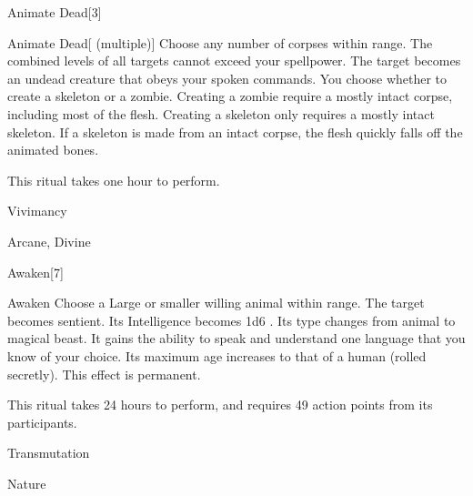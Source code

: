 
\begin{spellsection}{Animate Dead}[3]

\begin{spellheader}
\end{spellheader}


\begin{ability}{Animate Dead}[ (multiple)]
Choose any number of corpses within \rngclose range.
The combined levels of all targets cannot exceed your spellpower.
The target becomes an undead creature that obeys your spoken commands.
You choose whether to create a skeleton or a zombie.
Creating a zombie require a mostly intact corpse, including most of the flesh.
Creating a skeleton only requires a mostly intact skeleton.
If a skeleton is made from an intact corpse, the flesh quickly falls off the animated bones.

This ritual takes one hour to perform.
\end{ability}




 Vivimancy

 Arcane, Divine
\end{spellsection}


\begin{spellsection}{Awaken}[7]


\begin{ability}{Awaken}
Choose a Large or smaller willing animal within \rngclose range.
The target becomes sentient.
Its Intelligence becomes 1d6 .
Its type changes from animal to magical beast.
It gains the ability to speak and understand one language that you know of your choice.
Its maximum age increases to that of a human (rolled secretly).
This effect is permanent.

This ritual takes 24 hours to perform, and requires 49 action points from its participants.
\end{ability}




 Transmutation

 Nature
\end{spellsection}


